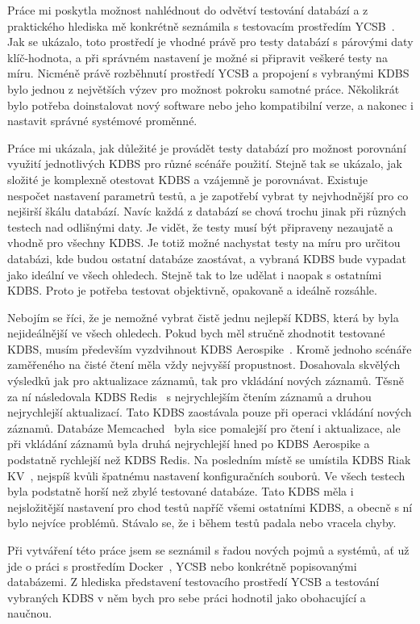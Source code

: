 \documentclass[czech,master,dept460,male,csharp,cpdeclaration]{diploma}
\begin{document}
	Práce mi poskytla možnost nahlédnout do odvětví testování databází a z praktického hlediska mě konkrétně seznámila s testovacím prostředím YCSB~\cite{ycsb}. Jak se ukázalo, toto prostředí je vhodné právě pro testy databází s párovými daty klíč-hodnota, a při správném nastavení je možné si připravit veškeré testy na míru. Nicméně právě rozběhnutí prostředí YCSB a propojení s vybranými KDBS bylo jednou z největších výzev pro možnost pokroku samotné práce. Několikrát bylo potřeba doinstalovat nový software nebo jeho kompatibilní verze, a nakonec i nastavit správné systémové proměnné.
	
	Práce mi ukázala, jak důležité je provádět testy databází pro možnost porovnání využití jednotlivých KDBS pro různé scénáře použití. Stejně tak se ukázalo, jak složité je komplexně otestovat KDBS a vzájemně je porovnávat. Existuje nespočet nastavení parametrů testů, a je zapotřebí vybrat ty nejvhodnější pro co nejširší škálu databází. Navíc každá z databází se chová trochu jinak při různých testech nad odlišnými daty. Je vidět, že testy musí být připraveny nezaujatě a vhodně pro všechny KDBS. Je totiž možné nachystat testy na míru pro určitou databázi, kde budou ostatní databáze zaostávat, a vybraná KDBS bude vypadat jako ideální ve všech ohledech. Stejně tak to lze udělat i naopak s ostatními KDBS. Proto je potřeba testovat objektivně, opakovaně a ideálně rozsáhle.
	
	Nebojím se říci, že je nemožné vybrat čistě jednu nejlepší KDBS, která by byla nejideálnější ve všech ohledech. Pokud bych měl stručně zhodnotit testované KDBS, musím především vyzdvihnout KDBS Aerospike~\cite{aerospike}. Kromě jednoho scénáře zaměřeného na čisté čtení měla vždy nejvyšší propustnost. Dosahovala skvělých výsledků jak pro aktualizace záznamů, tak pro vkládání nových záznamů. Těsně za ní následovala KDBS Redis~\cite{redis} s nejrychlejším čtením záznamů a druhou nejrychlejší aktualizací. Tato KDBS zaostávala pouze při operaci vkládání nových záznamů. Databáze Memcached~\cite{memcached} byla sice pomalejší pro čtení i aktualizace, ale při vkládání záznamů byla druhá nejrychlejší hned po KDBS Aerospike a podstatně rychlejší než KDBS Redis. Na posledním místě se umístila KDBS Riak KV~\cite{riak}, nejspíš kvůli špatnému nastavení konfiguračních souborů. Ve všech testech byla podstatně horší než zbylé testované databáze. Tato KDBS měla i nejsložitější nastavení pro chod testů napříč všemi ostatními KDBS, a obecně s ní bylo nejvíce problémů. Stávalo se, že i během testů padala nebo vracela chyby.
	
	Při vytváření této práce jsem se seznámil s řadou nových pojmů a systémů, ať už jde o práci s prostředím Docker~\cite{docker}, YCSB nebo konkrétně popisovanými databázemi. Z hlediska představení testovacího prostředí YCSB a testování vybraných KDBS v něm bych pro sebe práci hodnotil jako obohacující a naučnou.
	
	\nocite{*}
	
	\printbibliography[title={Literatura}, heading=bibintoc]
	
\end{document}
